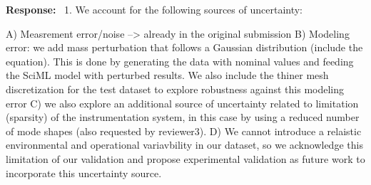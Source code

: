 \documentclass[11pt]{article}
\newenvironment{response}{\par\smallskip\noindent\color{resp}\textbf{Response:}\ }{\par}
\begin{document}
\begin{response}
	1. We account for the following sources of uncertainty: 
	
	A) Measrement error/noise --> already in the original submission 
	B) Modeling error: we add mass perturbation that follows a Gaussian distribution (include the equation). This is done by generating the data with nominal values and feeding the SciML model with perturbed results.  We also include the thiner mesh discretization for the test dataset to explore robustness against this modeling error
	C) we also explore an additional source of uncertainty related to limitation (sparsity) of the instrumentation system, in this case by using a reduced number of mode shapes (also requested by reviewer3). 
	D) We cannot introduce a relaistic environmental and operational variavbility in our dataset, so we acknowledge this limitation of our validation and propose experimental validation as future work to incorporate this uncertainty source. 
	

\end{response}
\end{document}
